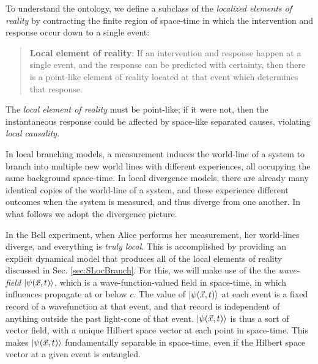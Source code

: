 \documentclass[a4paper]{article}
\begin{document}
To understand the ontology, we define a subclass of the \textit{localized elements of reality} by contracting the finite region of space-time in which the intervention and response occur down to a single event:

\begin{quote}
\textbf{Local element of reality}: If an intervention and response happen at a single event, and the response can be predicted with certainty, then there is a point-like element of reality located at that event which determines that response.
\end{quote}

The \textit{local element of reality} must be point-like; if it were not, then the instantaneous response could be affected by space-like separated causes, violating \textit{local causality}.

In local branching models, a measurement induces the world-line of a system to branch into multiple new world lines with different experiences, all occupying the same background space-time. In local divergence models, there are already many identical copies of the world-line of a system, and these experience different outcomes when the system is measured, and thus diverge from one another. In what follows we adopt the divergence picture.

In the Bell experiment, when Alice performs her measurement, her world-lines diverge, and everything is \textit{truly local}.  This is accomplished by providing an explicit dynamical model that produces all of the local elements of reality discussed in Sec. \ref{sec:SLocBranch}.  For this, we will make use of the the \textit{wave-field} $\Ket{\psi(\vec{x},t)}$, which is a wave-function-valued field in space-time, in which influences propagate at or below $c$.  The value of $\Ket{\psi(\vec{x},t)}$ at each event is a fixed record of a wavefunction at that event, and that record is independent of anything outside the past light-cone of that event.  $\Ket{\psi(\vec{x},t)}$ is thus a sort of vector field, with a unique Hilbert space vector at each point in space-time.  This makes $\Ket{\psi(\vec{x},t)}$ fundamentally separable in space-time, even if the Hilbert space vector at a given event is entangled.
\end{document}
